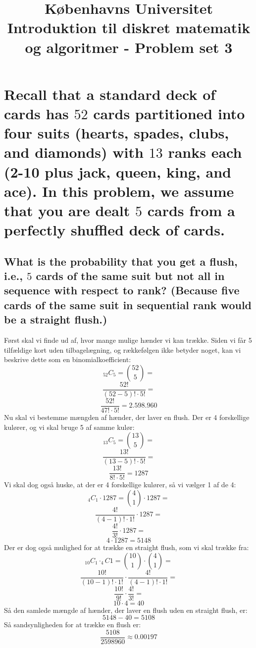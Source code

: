 \documentclass[a4paper,12pt]{article}
\begin{document}
% 

\title{Københavns Universitet\\
Introduktion til diskret matematik og algoritmer - Problem set 3}
\maketitle %


\section[Question 1]{Recall that a standard deck of cards has $52$ cards partitioned into four suits (hearts,
spades, clubs, and diamonds) with $13$ ranks each (2-10 plus jack, queen, king, and ace). In this
problem, we assume that you are dealt $5$ cards from a perfectly shuffled deck of cards.}

\subsection[]{What is the probability that you get a flush, i.e., $5$ cards of the same suit but not all in
sequence with respect to rank? (Because five cards of the same suit in sequential rank
would be a straight flush.)}

Først skal vi finde ud af, hvor mange mulige hænder vi kan trække. Siden vi får 5 tilfældige kort uden tilbagelægning, og rækkefølgen ikke betyder noget, kan vi beskrive dette som en binomialkoefficient:
\[ _{52}C_5 = {52 \choose 5} =\]
\[\dfrac{52!}{(52-5)! \cdot 5!} =\]
\[\dfrac{52!}{47! \cdot 5!} = 2.598.960\]
Nu skal vi bestemme mængden af hænder, der laver en flush. Der er 4 forskellige kulører, og vi skal bruge 5 af samme kulør:
\[ _{13}C_5 = {13 \choose 5} = \]
\[ \dfrac{13!}{(13-5)! \cdot 5!} = \]
\[ \dfrac{13!}{8! \cdot 5!} = 1287 \]
Vi skal dog også huske, at der er 4 forskellige kulører, så vi vælger 1 af de 4:
\[ _4C_1 \cdot 1287 = {4 \choose 1} \cdot 1287 = \]
\[ \dfrac{4!}{(4-1)! \cdot 1!} \cdot 1287 = \]
\[ \dfrac{4!}{3!} \cdot 1287 = \]
\[ 4 \cdot 1287 = 5148\]
Der er dog også mulighed for at trække en straight flush, som vi skal trække fra:
\[ _{10}C_1 \cdot _4C1 = {10 \choose 1} \cdot {4 \choose 1} = \]
\[ \dfrac{10!}{(10-1)! \cdot 1!} \cdot \dfrac{4!}{(4-1)! \cdot 1!} = \]
\[ \dfrac{10!}{9!} \cdot \dfrac{4!}{3!} = \]
\[ 10 \cdot 4 = 40\]
Så den samlede mængde af hænder, der laver en flush uden en straight flush, er:
\[ 5148 - 40 = 5108\]
Så sandsynligheden for at trække en flush er:
\[ \dfrac{5108}{2598960} \approx 0.00197\]
\end{document}

